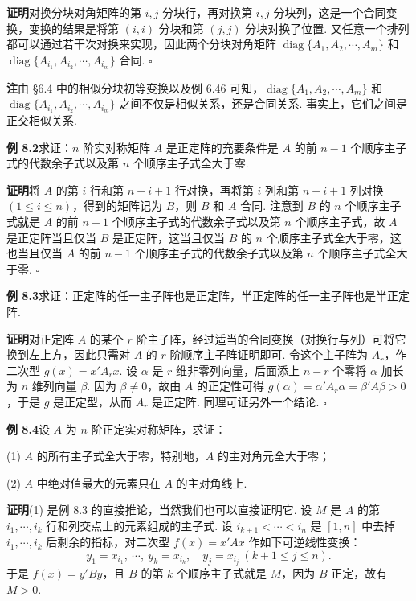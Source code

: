\documentclass[UTF8,12pt,a4paper,fontset=fandol]{ctexart}
\begin{document}
\noindent\textbf{证明}\quad 对换分块对角矩阵的第 $i,j$ 分块行，再对换第 $i,j$ 分块列，这是一个合同变换，变换的结果是将第 $(i,i)$ 分块和第 $(j,j)$ 分块对换了位置. 又任意一个排列都可以通过若干次对换来实现，因此两个分块对角矩阵 $\operatorname{diag}\{A_1,A_2,\cdots,A_m\}$ 和 $\operatorname{diag}\{A_{i_1},A_{i_2},\cdots,A_{i_m}\}$ 合同. $\ensuremath{\square}$

\noindent\textbf{注}\quad 由 §6.4 中的相似分块初等变换以及例 6.46 可知，$\operatorname{diag}\{A_1,A_2,\cdots,A_m\}$ 和 $\operatorname{diag}\{A_{i_1},A_{i_2},\cdots,A_{i_m}\}$ 之间不仅是相似关系，还是合同关系. 事实上，它们之间是正交相似关系.

\noindent\textbf{例 8.2}\quad 求证：$n$ 阶实对称矩阵 $A$ 是正定阵的充要条件是 $A$ 的前 $n-1$ 个顺序主子式的代数余子式以及第 $n$ 个顺序主子式全大于零.

\noindent\textbf{证明}\quad 将 $A$ 的第 $i$ 行和第 $n-i+1$ 行对换，再将第 $i$ 列和第 $n-i+1$ 列对换 $(1\le i\le n)$，得到的矩阵记为 $B$，则 $B$ 和 $A$ 合同. 注意到 $B$ 的 $n$ 个顺序主子式就是 $A$ 的前 $n-1$ 个顺序主子式的代数余子式以及第 $n$ 个顺序主子式，故 $A$ 是正定阵当且仅当 $B$ 是正定阵，这当且仅当 $B$ 的 $n$ 个顺序主子式全大于零，这也当且仅当 $A$ 的前 $n-1$ 个顺序主子式的代数余子式以及第 $n$ 个顺序主子式全大于零. $\ensuremath{\square}$

\noindent\textbf{例 8.3}\quad 求证：正定阵的任一主子阵也是正定阵，半正定阵的任一主子阵也是半正定阵.

\noindent\textbf{证明}\quad 对正定阵 $A$ 的某个 $r$ 阶主子阵，经过适当的合同变换（对换行与列）可将它换到左上方，因此只需对 $A$ 的 $r$ 阶顺序主子阵证明即可. 令这个主子阵为 $A_r$，作二次型 $g(x)=x'A_rx$. 设 $\alpha$ 是 $r$ 维非零列向量，后面添上 $n-r$ 个零将 $\alpha$ 加长为 $n$ 维列向量 $\beta$. 因为 $\beta\ne 0$，故由 $A$ 的正定性可得 $g(\alpha)=\alpha'A_r\alpha=\beta'A\beta>0$，于是 $g$ 是正定型，从而 $A_r$ 是正定阵. 同理可证另外一个结论. $\ensuremath{\square}$

\noindent\textbf{例 8.4}\quad 设 $A$ 为 $n$ 阶正定实对称矩阵，求证：

(1) $A$ 的所有主子式全大于零，特别地，$A$ 的主对角元全大于零；

(2) $A$ 中绝对值最大的元素只在 $A$ 的主对角线上.

\noindent\textbf{证明}\quad (1) 是例 8.3 的直接推论，当然我们也可以直接证明它. 设 $M$ 是 $A$ 的第 $i_1,\cdots,i_k$ 行和列交点上的元素组成的主子式. 设 $i_{k+1}<\cdots<i_n$ 是 $[1,n]$ 中去掉 $i_1,\cdots,i_k$ 后剩余的指标，对二次型 $f(x)=x'Ax$ 作如下可逆线性变换：
\[
y_1=x_{i_1},\ \cdots,\ y_k=x_{i_k},\quad y_j=x_{i_j}\ (k+1\le j\le n).
\]
于是 $f(x)=y'By$，且 $B$ 的第 $k$ 个顺序主子式就是 $M$，因为 $B$ 正定，故有 $M>0$.
\end{document}
